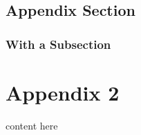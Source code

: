 \documentclass[hidelinks,11pt,a4paper,oneside,article]{memoir}
\numberwithin{equation}{chapter}
\begin{document}
\section{Appendix Section}


\subsection{With a Subsection}

\clearpage %



\chapter{Appendix 2}\label{appx:second}

content here 

\clearpage
{}
\end{document}
